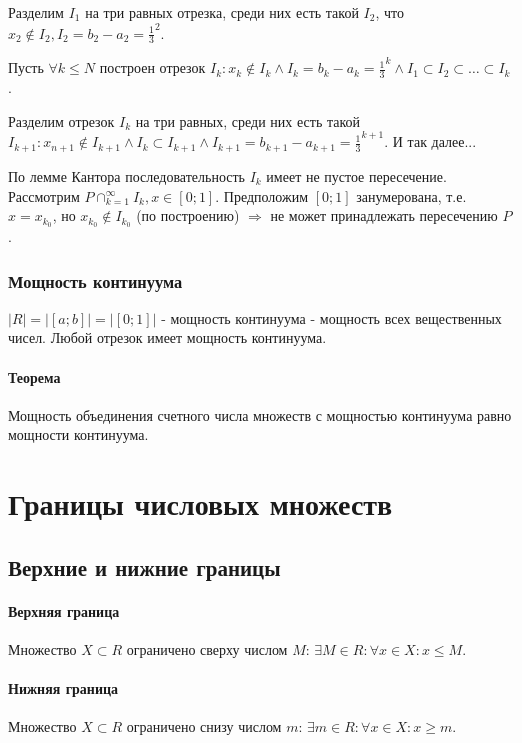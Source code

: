 \documentclass[10pt]{article}
\begin{document}
			Разделим $I_1$ на три равных отрезка, среди них есть такой $I_2$, что $x_2 \notin I_2, I_2 = b_2 - a_2 = \frac{1}{3}^2$. 
			
			Пусть $\forall k \le N$ построен отрезок $I_k : x_k \notin I_k \wedge I_k = b_k - a_k = \frac{1}{3}^k \wedge I_1 \subset I_2 \subset \dots \subset I_k$.
			
			Разделим отрезок $I_k$ на три равных, среди них есть такой \\$I_{k+1} : x_{n+1} \notin I_{k+1} \wedge I_{k} \subset I_{k+1} \wedge I_{k+1} = b_{k+1} - a_{k+1} = \frac{1}{3}^{k+1}$. И так далее...
			
			По лемме Кантора последовательность $I_k$ имеет не пустое пересечение. Рассмотрим $P \cap_{k=1}^{\infty} I_k, x \in [0;1]$. Предположим $[0;1]$ занумерована, т.е. $x = x_{k_0}$, но $x_{k_0} \notin I_{k_0}$ (по построению) $\Rightarrow$ не может принадлежать пересечению $P$.
			
			\subsubsection{Мощность континуума}
			$|R| = |[a;b]| = |[0;1]|$ - мощность континуума - мощность всех вещественных чисел. Любой отрезок имеет мощность континуума.
			
			\paragraph{Теорема}
			Мощность объединения счетного числа множеств с мощностью континуума равно мощности континуума.
	\section{Границы числовых множеств}
		\subsection{Верхние и нижние границы}
			\paragraph{Верхняя граница} Множество $X \subset R$ ограничено сверху числом $M$: $\exists M \in R : \forall x \in X : x \le M$.
			\paragraph{Нижняя граница} Множество $X \subset R$ ограничено снизу числом $m$: $\exists m \in R : \forall x \in X : x \geq m$.
\end{document}
